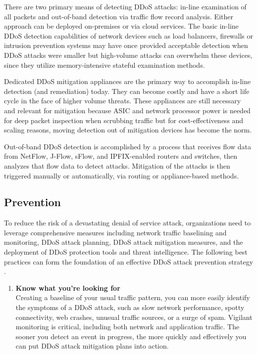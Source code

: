 \documentclass[a4paper, 12pt]{report} %
\begin{document}
\begin{table}[h!]
\begin{itemize}
                        \end{itemize}

                        There are two primary means of detecting DDoS attacks: in-line examination of all packets and out-of-band detection via traffic flow record analysis. Either approach can be deployed on-premises or via cloud services. The basic in-line DDoS detection capabilities of network devices such as load balancers, firewalls or intrusion prevention systems may have once provided acceptable detection when DDoS attacks were smaller but high-volume attacks can overwhelm these devices, since they utilize memory-intensive stateful examination methods.

                        Dedicated DDoS mitigation appliances are the primary way to accomplish in-line detection (and remediation) today. They can become costly and have a short life cycle in the face of higher volume threats. These appliances are still necessary and relevant for mitigation because ASIC and network processor power is needed for deep packet inspection when scrubbing traffic but for cost-effectiveness and scaling reasons, moving detection out of mitigation devices has become the norm.

                        Out-of-band DDoS detection is accomplished by a process that receives flow data from NetFlow, J-Flow, sFlow, and IPFIX-enabled routers and switches, then analyzes that flow data to detect attacks. Mitigation of the attacks is then triggered manually or automatically, via routing or appliance-based methods.

                    \subsection{Prevention}

                    To reduce the risk of a devastating denial of service attack, organizations need to leverage comprehensive measures including network traffic baselining and monitoring, DDoS attack planning, DDoS attack mitigation measures, and the deployment of DDoS protection tools and threat intelligence. The following best practices can form the foundation of an effective DDoS attack prevention strategy \cite{ddos_prevention}.

                    \begin{enumerate}
                        \item \textbf{Know what you're looking for} \\ Creating a baseline of your usual traffic pattern, you can more easily identify the symptoms of a DDoS attack, such as slow network performance, spotty connectivity, web crashes, unusual traffic sources, or a surge of spam. Vigilant monitoring is critical, including both network and application traffic. The sooner you detect an event in progress, the more quickly and effectively you can put DDoS attack mitigation plans into action.


\end{enumerate}
\end{table}
\end{document}
